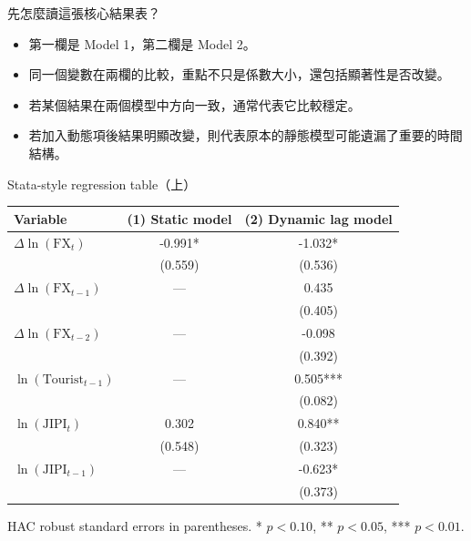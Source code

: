 \documentclass[aspectratio=169]{ctexbeamer}
\begin{document}
\begin{frame}{先怎麼讀這張核心結果表？}
\begin{itemize}
  \item 第一欄是 Model 1，第二欄是 Model 2。
  \item 同一個變數在兩欄的比較，重點不只是係數大小，還包括顯著性是否改變。
  \item 若某個結果在兩個模型中方向一致，通常代表它比較穩定。
  \item 若加入動態項後結果明顯改變，則代表原本的靜態模型可能遺漏了重要的時間結構。
\end{itemize}
\end{frame}

\begin{frame}{Stata-style regression table（上）}
\small
\setlength{\tabcolsep}{4pt}
\begin{tabular}{lcc}
\toprule
Variable & (1) Static model & (2) Dynamic lag model \\
\midrule
$\Delta \ln(\mathrm{FX}_t)$ & -0.991* & -1.032* \\
 & (0.559) & (0.536) \\
$\Delta \ln(\mathrm{FX}_{t-1})$ & --- & 0.435 \\
 &  & (0.405) \\
$\Delta \ln(\mathrm{FX}_{t-2})$ & --- & -0.098 \\
 &  & (0.392) \\
$\ln(\mathrm{Tourist}_{t-1})$ & --- & 0.505*** \\
 &  & (0.082) \\
$\ln(\mathrm{JIPI}_t)$ & 0.302 & 0.840** \\
 & (0.548) & (0.323) \\
$\ln(\mathrm{JIPI}_{t-1})$ & --- & -0.623* \\
 &  & (0.373) \\
\bottomrule
\end{tabular}
\vspace{0.2em}

\scriptsize
HAC robust standard errors in parentheses. * $p<0.10$, ** $p<0.05$, *** $p<0.01$.
\end{frame}
\end{document}
